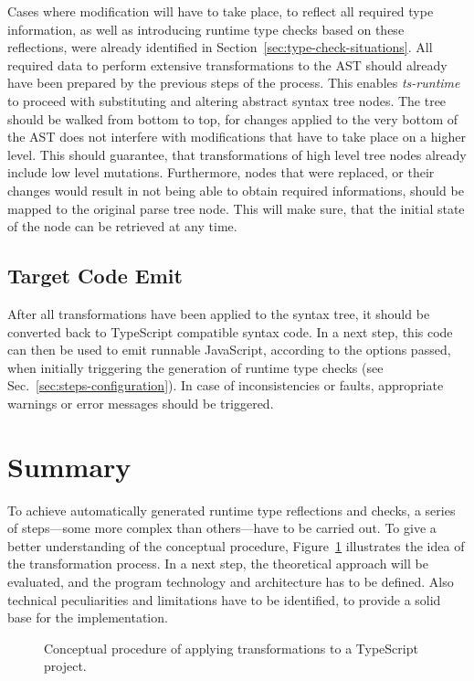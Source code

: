 Cases where modification will have to take place, to reflect all required type information, as well as introducing runtime type checks based on these reflections, were already identified in Section~\ref{sec:type-check-situations}. All required data to perform extensive transformations to the AST should already have been prepared by the previous steps of the process. This enables \emph{ts-runtime} to proceed with substituting and altering abstract syntax tree nodes. The tree should be walked from bottom to top, for changes applied to the very bottom of the AST does not interfere with modifications that have to take place on a higher level. This should guarantee, that transformations of high level tree nodes already include low level mutations. Furthermore, nodes that were replaced, or their changes would result in not being able to obtain required informations, should be mapped to the original parse tree node. This will make sure, that the initial state of the node can be retrieved at any time.

\subsection{Target Code Emit}

After all transformations have been applied to the syntax tree, it should be converted back to TypeScript compatible syntax code. In a next step, this code can then be used to emit runnable JavaScript, according to the options passed, when initially triggering the generation of runtime type checks (see Sec.~\ref{sec:steps-configuration}). In case of inconsistencies or faults, appropriate warnings or error messages should be triggered.

\section{Summary}
\label{sec:theoretical-approach-summary}

To achieve automatically generated runtime type reflections and checks, a series of steps---some more complex than others---have to be carried out. To give a better understanding of the conceptual procedure, Figure~\ref{fig:theoretical-approach} illustrates the idea of the transformation process. In a next step, the theoretical approach will be evaluated, and the program technology and architecture has to be defined. Also technical peculiarities and limitations have to be identified, to provide a solid base for the implementation.
\begin{figure}
\centering

\caption{Conceptual procedure of applying transformations to a TypeScript project.}
\label{fig:theoretical-approach}
\end{figure}

